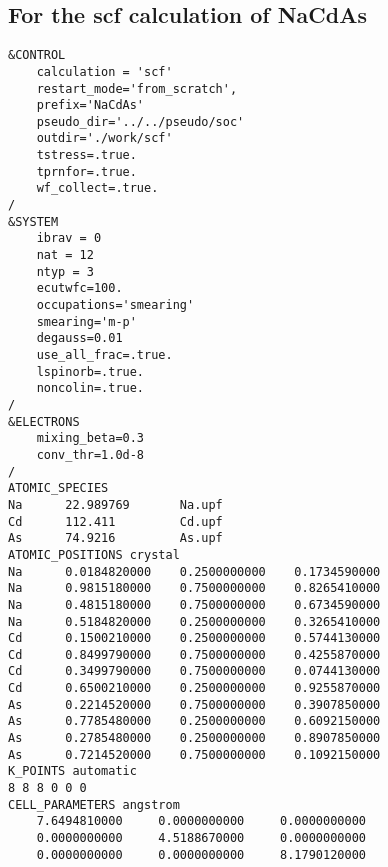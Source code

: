 \documentclass[3p,preprint]{elsarticle}
\begin{document}
\subsection{For the scf calculation of NaCdAs}\label{app:NaCdAs-scf-in}
\begin{lstlisting}[basicstyle=\ttfamily\footnotesize]
&CONTROL
    calculation = 'scf'
    restart_mode='from_scratch',
    prefix='NaCdAs'
    pseudo_dir='../../pseudo/soc'
    outdir='./work/scf'
    tstress=.true.
    tprnfor=.true.
    wf_collect=.true.
/
&SYSTEM
    ibrav = 0
    nat = 12
    ntyp = 3
    ecutwfc=100.
    occupations='smearing'
    smearing='m-p'
    degauss=0.01
    use_all_frac=.true.
    lspinorb=.true.
    noncolin=.true.
/
&ELECTRONS
    mixing_beta=0.3
    conv_thr=1.0d-8
/
ATOMIC_SPECIES
Na      22.989769       Na.upf
Cd      112.411         Cd.upf
As      74.9216         As.upf
ATOMIC_POSITIONS crystal
Na      0.0184820000    0.2500000000    0.1734590000
Na      0.9815180000    0.7500000000    0.8265410000
Na      0.4815180000    0.7500000000    0.6734590000
Na      0.5184820000    0.2500000000    0.3265410000
Cd      0.1500210000    0.2500000000    0.5744130000
Cd      0.8499790000    0.7500000000    0.4255870000
Cd      0.3499790000    0.7500000000    0.0744130000
Cd      0.6500210000    0.2500000000    0.9255870000
As      0.2214520000    0.7500000000    0.3907850000
As      0.7785480000    0.2500000000    0.6092150000
As      0.2785480000    0.2500000000    0.8907850000
As      0.7214520000    0.7500000000    0.1092150000
K_POINTS automatic
8 8 8 0 0 0
CELL_PARAMETERS angstrom
    7.6494810000     0.0000000000     0.0000000000
    0.0000000000     4.5188670000     0.0000000000
    0.0000000000     0.0000000000     8.1790120000
    
\end{lstlisting}
\end{document}

